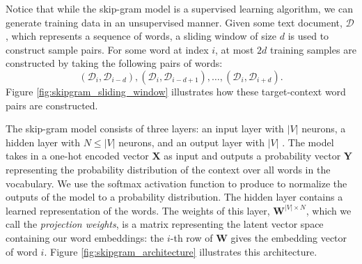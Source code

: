 \documentclass{paper}
\let\vec\mathbf
\newcommand{\mat}[1]{\bm{#1}}
\begin{document}
Notice that while the skip-gram model is a supervised learning algorithm, we can generate training data in an unsupervised manner. Given some text document, $\mathcal{D}$, which represents a sequence of words, a sliding window of size $d$ is used to construct sample pairs. For some word at index $i$, at most $2d$ training samples are constructed by taking the following pairs of words:
\begin{equation*}
    (\mathcal{D}_{i}, \mathcal{D}_{i-d}), (\mathcal{D}_{i}, \mathcal{D}_{i-d+1}),\ldots, (\mathcal{D}_{i}, \mathcal{D}_{i+d}).
\end{equation*}
Figure \ref{fig:skipgram_sliding_window} illustrates how these target-context word pairs are constructed.

The skip-gram model consists of three layers: an input layer with $|V|$ neurons, a hidden layer with $N\leq|V|$ neurons, and an output layer with $|V|$ \cite{mikolov2013efficient}. The model takes in a one-hot encoded vector $\vec{X}$ as input and outputs a probability vector $\vec{Y}$ representing the probability distribution of the context over all words in the vocabulary. We use the softmax activation function to produce to normalize the outputs of the model to a probability distribution. The hidden layer contains a learned representation of the words. The weights of this layer, $\mat{W}^{|V|\times N}$, which we call the \textit{projection weights}, is a matrix representing the latent vector space containing our word embeddings: the $i$-th row of $\mat{W}$ gives the embedding vector of word $i$. Figure \ref{fig:skipgram_architecture} illustrates this architecture.
\end{document}
